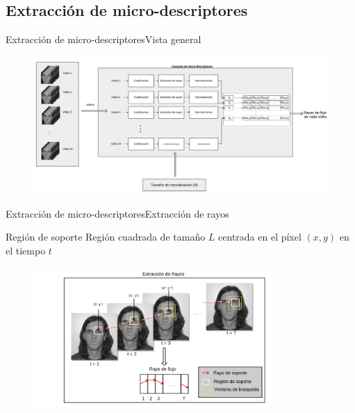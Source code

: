 \documentclass{beamer}
\begin{document}
    
    
    \subsection{Extracción de micro-descriptores}
        \begin{frame}{Extracción de micro-descriptores}{Vista general}
            \begin{figure}[bt]
        		\centering
                \includegraphics[width=12cm]{imagenes/Extractor_microdescriptores.png}
            \end{figure}
        \end{frame}
    
    
        \begin{frame}{Extracción de micro-descriptores}{Extracción de rayos}
			\begin{block}{Región de soporte}
            		Región cuadrada de tamaño $L$ centrada en el píxel $(x,y)$ en el tiempo $t$
            \end{block}    			
    			
    			\begin{figure}[bt]
        			\centering
                \includegraphics[width=9cm]{imagenes/Extraccion_de_rayos.png}
            \end{figure}        
	        
        \end{frame}
    
\end{document}
